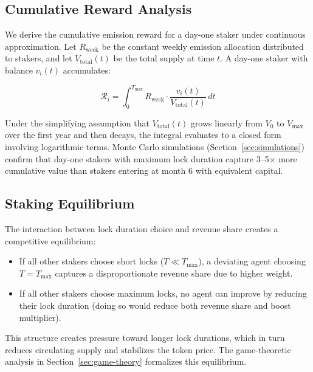 \subsection{Cumulative Reward Analysis}
\label{subsec:cumulative-reward}

We derive the cumulative emission reward for a day-one staker under continuous
approximation. Let $R_{\text{week}}$ be the constant weekly emission allocation
distributed to stakers, and let $V_{\text{total}}(t)$ be the total \veCORTEX{}
supply at time $t$. A day-one staker with \veCORTEX{} balance $v_i(t)$
accumulates:

\begin{equation}
  \mathcal{R}_i = \int_0^{T_{\max}} R_{\text{week}} \cdot \frac{v_i(t)}{V_{\text{total}}(t)} \, dt
  \label{eq:cumulative-reward}
\end{equation}

Under the simplifying assumption that $V_{\text{total}}(t)$ grows linearly
from $V_0$ to $V_{\max}$ over the first year and then decays, the integral
evaluates to a closed form involving logarithmic terms. Monte Carlo simulations
(Section~\ref{sec:simulations}) confirm that day-one stakers with maximum lock
duration capture 3--5$\times$ more cumulative value than stakers entering at
month 6 with equivalent capital.

\subsection{Staking Equilibrium}
\label{subsec:staking-eq}

The interaction between lock duration choice and revenue share creates a
competitive equilibrium:

\begin{itemize}
  \item If all other stakers choose short locks ($T \ll T_{\max}$), a
    deviating agent choosing $T = T_{\max}$ captures a disproportionate revenue
    share due to higher \veCORTEX{} weight.
  \item If all other stakers choose maximum locks, no agent can improve by
    reducing their lock duration (doing so would reduce both revenue share and
    boost multiplier).
\end{itemize}

This structure creates pressure toward longer lock durations, which in turn
reduces circulating supply and stabilizes the token price. The game-theoretic
analysis in Section~\ref{sec:game-theory} formalizes this equilibrium.
